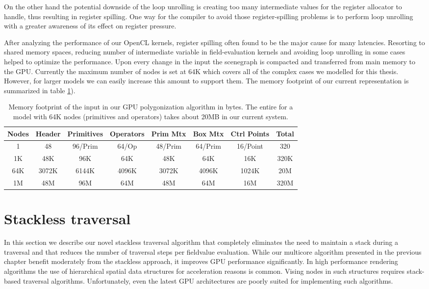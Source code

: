 On the other hand the potential downside of the loop unrolling is creating too many intermediate values for the register allocator to handle, thus resulting in 
register spilling. One way for the compiler to avoid those register-spilling problems is to perform loop unrolling with a greater awareness of its effect on register 
pressure. 

After analyzing the performance of our OpenCL kernels, register spilling often found to be the major cause for many latencies. Resorting to shared memory spaces, reducing 
number of intermediate variable in field-evaluation kernels and avoiding loop unrolling in some cases helped to optimize the performance. Upon every
change in the input \blob the scenegraph is compacted and transferred from main memory to the GPU. Currently the maximum number of nodes is set at 64K which covers
all of the complex cases we modelled for this thesis. However, for larger \blob models  we can easily increase this amount to support them. The memory footprint of 
our current \blob representation is summarized in table \ref{table:memfootprint}).

\begin{table}[H]
\begin{center}
	 \caption{\label{table:memfootprint}
  {Memory footprint of the input \blob in our GPU polygonization algorithm in bytes. The entire \blob for a model with 64K nodes (primitives and operators) 
  takes about 20MB in our current system.}
}
  \begin{tabular}{ | c | c | c | c | c | c | c | c |}
    \hline    
    Nodes & Header & Primitives & Operators & Prim Mtx & Box Mtx & Ctrl Points & Total \\ \hline \hline
    1 & 48 & 96/Prim & 64/Op & 48/Prim & 64/Prim & 16/Point & 320 \\ \hline
    1K & 48K & 96K & 64K & 48K & 64K & 16K & 320K \\ \hline
    64K & 3072K & 6144K & 4096K & 3072K & 4096K & 1024K & 20M \\ \hline
    1M & 48M & 96M & 64M & 48M & 64M & 16M & 320M \\ 
    \hline
  	\end{tabular}
\end{center}
\end{table}


\section{Stackless \blob traversal}
\label{sec:stackless}
In this section we describe our novel stackless \blob traversal algorithm that completely eliminates the need to maintain a stack during a \blob
traversal and that reduces the number of traversal steps per fieldvalue evaluation. While our multicore algorithm presented in the previous chapter 
benefit moderately from the stackless approach, it improves GPU performance significantly. In high performance rendering algorithms the use of 
hierarchical spatial data structures for acceleration reasons is common. Vising nodes in such structures requires stack-based traversal 
algorithms. Unfortunately, even the latest GPU architectures are poorly suited for implementing such algorithms. 



